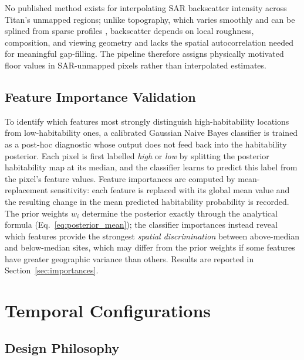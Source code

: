 No published method exists for interpolating SAR backscatter intensity across Titan's unmapped regions; unlike topography, which varies smoothly and can be splined from sparse profiles \citep{Lorenz2013,Corlies2017Titan}, backscatter depends on local roughness, composition, and viewing geometry and lacks the spatial autocorrelation needed for meaningful gap-filling.  The pipeline therefore assigns physically motivated floor values in SAR-unmapped pixels rather than interpolated estimates.

\subsection{Feature Importance Validation}
\label{sec:classifier}

To identify which features most strongly distinguish high-habitability locations from low-habitability ones, a calibrated Gaussian Naive Bayes classifier is trained as a post-hoc diagnostic whose output does not feed back into the habitability posterior.  Each pixel is first labelled \textit{high} or \textit{low} by splitting the posterior habitability map at its median, and the classifier learns to predict this label from the pixel's feature values.  Feature importances are computed by mean-replacement sensitivity: each feature is replaced with its global mean value and the resulting change in the mean predicted habitability probability is recorded.  The prior weights $w_i$ determine the posterior exactly through the analytical formula (Eq.~\ref{eq:posterior_mean}); the classifier importances instead reveal which features provide the strongest \textit{spatial discrimination} between above-median and below-median sites, which may differ from the prior weights if some features have greater geographic variance than others.  Results are reported in Section~\ref{sec:importances}.

\section{Temporal Configurations}
\label{sec:temporal_configs}

\subsection{Design Philosophy}
\label{sec:temporal_design}

